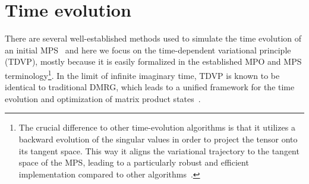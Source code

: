 \documentclass{svmono}
\begin{document}
\section{Time evolution}
\label{sec:time_evolution}
There are several well-established methods used to simulate the time evolution of an initial MPS~\cite{Paeckel2019} and here we focus on the time-dependent variational principle (TDVP), mostly because it is easily formalized in the established MPO and MPS terminology\footnote{The crucial difference to other time-evolution algorithms is that it utilizes a backward evolution of the singular values in order to project the tensor onto its tangent space.
This way it aligns the variational trajectory to the tangent space of the MPS, leading to a particularly robust and efficient implementation compared to other algorithms~\cite{Haegeman2011}.}.
In the limit of infinite imaginary time, TDVP is known to be identical to traditional DMRG, which leads to a unified framework for the time evolution and optimization of matrix product states~\cite{Haegeman2016}.
\end{document}
